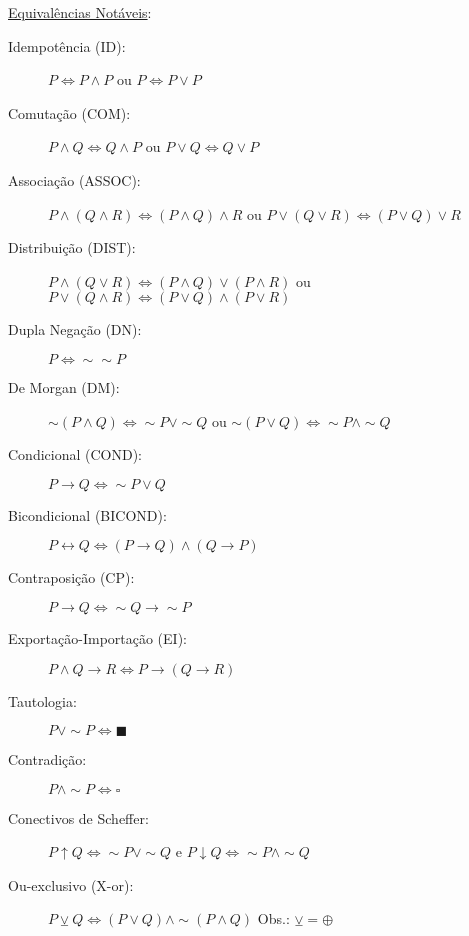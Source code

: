 \documentclass[12pt]{article}
\begin{document}
\underline{Equivalências Notáveis}:
\begin{description}
\item[Idempotência (ID):] $P\Leftrightarrow P\wedge P$ ou $P\Leftrightarrow P\vee P$
\item[Comutação (COM):] $P\wedge Q\Leftrightarrow Q\wedge P$ ou $P\vee Q\Leftrightarrow Q\vee P$
\item[Associação (ASSOC):] $P\wedge(Q\wedge R)\Leftrightarrow (P\wedge Q)\wedge R$ ou $P\vee(Q\vee R)\Leftrightarrow (P\vee Q)\vee R$ 
\item[Distribuição (DIST):] $P\wedge(Q\vee R)\Leftrightarrow (P\wedge Q)\vee (P \wedge R)$ ou $P\vee(Q\wedge R)\Leftrightarrow (P\vee Q)\wedge (P\vee R)$
\item[Dupla Negação (DN):] $P\Leftrightarrow\sim\sim P$
\item[De Morgan (DM):] $\sim(P \wedge Q) \Leftrightarrow \sim P \vee\sim Q$ ou $\sim(P \vee Q) \Leftrightarrow \sim P \wedge\sim Q$
\item[Condicional (COND):] $P\rightarrow Q \Leftrightarrow\sim P \vee Q$

\item[Bicondicional (BICOND):] $P\leftrightarrow Q \Leftrightarrow (P\rightarrow Q)\wedge(Q\rightarrow P)$

\item[Contraposição (CP):] $P\rightarrow Q \Leftrightarrow \sim Q\rightarrow\sim P$

\item[Exportação-Importação (EI):] $P\wedge Q\rightarrow R \Leftrightarrow P\rightarrow(Q\rightarrow R)$

\item[Tautologia:] $P\vee \sim P \Leftrightarrow  \blacksquare  $

\item[Contradição:] $ P\wedge \sim P \Leftrightarrow \square $

\item[Conectivos de Scheffer:] $P \uparrow Q \Leftrightarrow \sim P \vee \sim Q$ e $P \downarrow Q \Leftrightarrow \sim P \wedge \sim Q$ 

\item[Ou-exclusivo (X-or):] $P \veebar Q \Leftrightarrow (P \vee Q) \wedge\sim (P \wedge Q)$ Obs.: $\veebar = \oplus$

\end{description}
%
\end{document}
